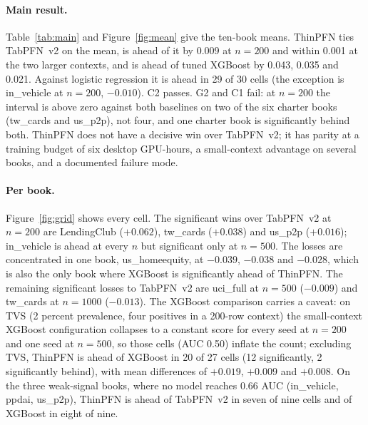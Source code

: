 \documentclass[twocolumn,10pt]{article}
\begin{document}
\paragraph{Main result.} Table~\ref{tab:main} and Figure~\ref{fig:mean} give the ten-book means. ThinPFN ties TabPFN~v2
on the mean, is ahead of it by 0.009 at $n=200$ and within 0.001 at the two larger contexts, and is ahead of tuned
XGBoost by 0.043, 0.035 and 0.021. Against logistic regression it is ahead in 29 of 30 cells (the exception is
in\_vehicle at $n=200$, $-0.010$). C2 passes. G2 and C1 fail: at
$n=200$ the interval is above zero against both baselines on two of the six charter books (tw\_cards and us\_p2p), not
four, and one charter book is significantly behind both. ThinPFN does not have a decisive win over TabPFN~v2; it has
parity at a training budget of six desktop GPU-hours, a small-context advantage on several books,
and a documented failure mode.

\paragraph{Per book.} Figure~\ref{fig:grid} shows every cell. The significant wins over TabPFN~v2 at $n=200$ are
LendingClub ($+0.062$), tw\_cards ($+0.038$) and us\_p2p ($+0.016$); in\_vehicle is ahead at every $n$ but significant
only at $n=500$. The losses are concentrated in one book, us\_homeequity, at $-0.039$, $-0.038$ and $-0.028$, which is
also the only book where XGBoost is significantly ahead of ThinPFN. The remaining significant losses to
TabPFN~v2 are uci\_full at $n=500$ ($-0.009$) and tw\_cards at $n=1000$ ($-0.013$). The XGBoost comparison carries a
caveat: on TVS (2 percent prevalence, four positives in a 200-row context) the small-context XGBoost configuration
collapses to a constant score for every seed at $n=200$ and one seed at $n=500$, so those cells (AUC 0.50) inflate the
count; excluding TVS, ThinPFN is ahead of XGBoost in 20 of 27 cells (12 significantly, 2 significantly behind), with
mean differences of $+0.019$, $+0.009$ and $+0.008$. On the three weak-signal books, where no model reaches 0.66 AUC
(in\_vehicle, ppdai, us\_p2p), ThinPFN is ahead of TabPFN~v2 in seven of nine cells and of XGBoost in eight of nine.
\end{document}

